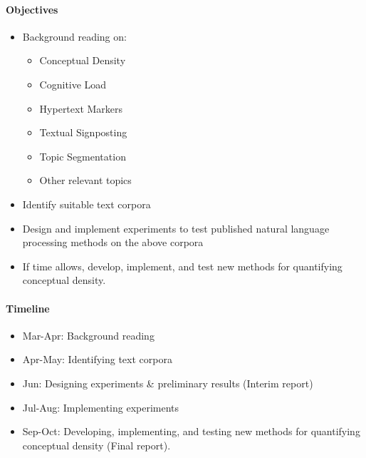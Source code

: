 \documentclass[12pt]{article}
\theoremstyle{grammarstyle}
\begin{document}
\paragraph{Objectives}
\begin{itemize}[noitemsep]
\item Background reading on: 

	\begin{itemize}[noitemsep]
		\item Conceptual Density
		\item Cognitive Load
		\item Hypertext Markers
		\item Textual Signposting
		\item Topic Segmentation
		\item Other relevant topics
	\end{itemize}

\item Identify suitable text corpora
\item Design and implement experiments to test published natural language processing methods on the above corpora
\item If time allows, develop, implement, and test new methods for quantifying conceptual density.
\end{itemize}

\paragraph{Timeline} 
\begin{itemize}[noitemsep]
\item Mar-Apr: Background reading
\item Apr-May: Identifying text corpora
\item Jun: Designing experiments \& preliminary results (Interim report)
\item Jul-Aug: Implementing experiments
\item Sep-Oct: Developing, implementing, and testing new methods for quantifying conceptual density (Final report).
\end{itemize}
\end{document}
